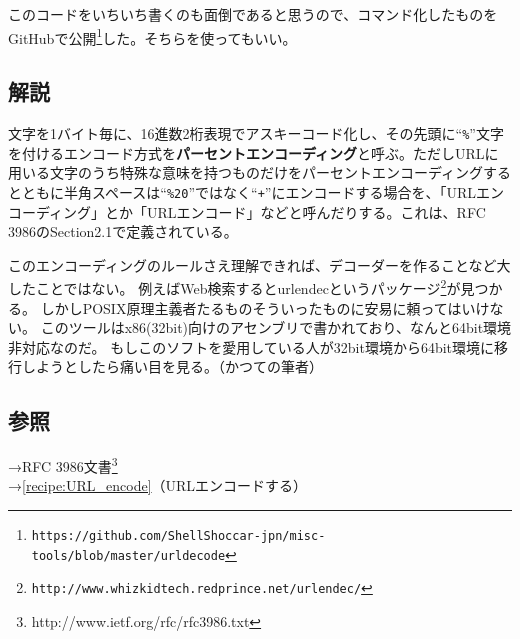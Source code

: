 このコードをいちいち書くのも面倒であると思うので、コマンド化したものをGitHubで公開\footnote{\verb|https://github.com/ShellShoccar-jpn/misc-tools/blob/master/urldecode|}した。そちらを使ってもいい。

\subsection*{解説}
文字を1バイト毎に、16進数2桁表現でアスキーコード化し、その先頭に``\verb|%|''文字を付けるエンコード方式を\textbf{パーセントエンコーディング}と呼ぶ。ただしURLに用いる文字のうち特殊な意味を持つものだけをパーセントエンコーディングするとともに半角スペースは``\verb|%20|''ではなく``\verb|+|''にエンコードする場合を、「URLエンコーディング」とか「URLエンコード」などと呼んだりする。これは、RFC 3986のSection2.1で定義されている。

このエンコーディングのルールさえ理解できれば、デコーダーを作ることなど大したことではない。
例えばWeb検索するとurlendecというパッケージ\footnote{\verb|http://www.whizkidtech.redprince.net/urlendec/|}が見つかる。
しかしPOSIX原理主義者たるものそういったものに安易に頼ってはいけない。
このツールはx86(32bit)向けのアセンブリで書かれており、なんと64bit環境非対応なのだ。
もしこのソフトを愛用している人が32bit環境から64bit環境に移行しようとしたら痛い目を見る。（かつての筆者）

\subsection*{参照}

\noindent
→RFC 3986文書\footnote{http://www.ietf.org/rfc/rfc3986.txt} \\
→\ref{recipe:URL_encode}（URLエンコードする）

